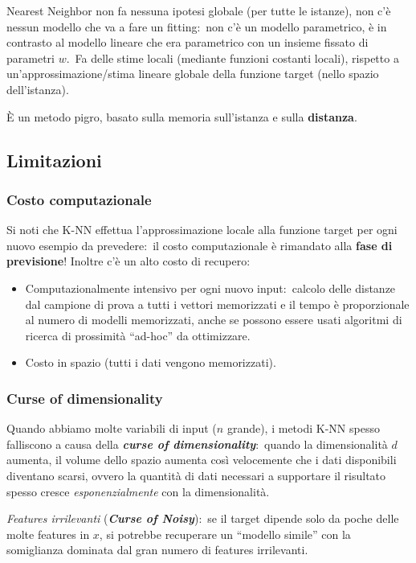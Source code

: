 \noindent Nearest Neighbor non fa nessuna ipotesi globale (per tutte le istanze), non c'è nessun modello che va a fare un fitting:\ non c'è un modello parametrico, è in contrasto al modello lineare che era parametrico con un insieme fissato di parametri $w$.\
Fa delle stime locali (mediante funzioni costanti locali), rispetto a un'approssimazione/stima lineare globale della funzione target (nello spazio dell'istanza).
\begin{flushleft}
	È un metodo pigro, basato sulla memoria sull'istanza e sulla \textbf{distanza}.
\end{flushleft}

\subsection{Limitazioni}

\subsubsection{Costo computazionale}

Si noti che K-NN effettua l'approssimazione locale alla funzione target per ogni nuovo esempio da prevedere:\ il costo computazionale è rimandato alla \textbf{fase di previsione}!
Inoltre c'è un alto costo di recupero:
\begin{itemize}
	\item Computazionalmente intensivo per ogni nuovo input:\ calcolo delle distanze dal campione di prova a tutti i vettori memorizzati e il tempo è proporzionale al numero di modelli memorizzati, anche se possono essere usati algoritmi di ricerca di prossimità ``ad-hoc'' da ottimizzare.
	\item Costo in spazio (tutti i dati vengono memorizzati).
\end{itemize}

\subsubsection{Curse of dimensionality}

Quando abbiamo molte variabili di input ($n$ grande), i metodi K-NN spesso falliscono a causa della \textbf{\textit{curse of dimensionality}}:\ quando la dimensionalità $d$ aumenta, il volume dello spazio aumenta così velocemente che i dati disponibili diventano scarsi, ovvero la quantità di dati necessari a supportare il risultato spesso cresce \textit{esponenzialmente} con la dimensionalità.

\textit{Features irrilevanti} (\textbf{\textit{Curse of Noisy}}):\ se il target dipende solo da poche delle molte features in $x$, si potrebbe recuperare un ``modello simile'' con la somiglianza dominata dal gran numero di features irrilevanti.\

